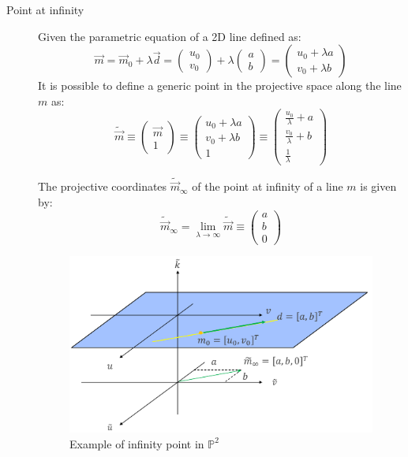 \begin{description}
    \item[Point at infinity] 
        Given the parametric equation of a 2D line defined as:
        \[ 
            \vec{m} = \vec{m}_0 + \lambda \vec{d} = 
            \begin{pmatrix} u_0 \\ v_0 \end{pmatrix} + \lambda \begin{pmatrix} a \\ b \end{pmatrix} =
            \begin{pmatrix} u_0 + \lambda a \\ v_0 + \lambda b \end{pmatrix}
        \]
        It is possible to define a generic point in the projective space along the line $m$ as:
        \[ 
            \tilde{\vec{m}} \equiv 
            \begin{pmatrix} \vec{m} \\ 1 \end{pmatrix} \equiv
            \begin{pmatrix} u_0 + \lambda a \\ v_0 + \lambda b \\ 1 \end{pmatrix} \equiv
            \begin{pmatrix} \frac{u_0}{\lambda} + a \\ \frac{v_0}{\lambda} + b \\ \frac{1}{\lambda} \end{pmatrix}
        \]

        The projective coordinates $\tilde{\vec{m}}_\infty$ of the point at infinity of a line $m$ is given by:
        \[ \tilde{\vec{m}}_\infty = \lim_{\lambda \rightarrow \infty} \tilde{\vec{m}} \equiv \begin{pmatrix} a \\ b \\ 0 \end{pmatrix} \]

        \begin{figure}[H]
            \centering
            \includegraphics[width=0.6\linewidth]{./img/_projective_point_inifinity.pdf}
            \caption{Example of infinity point in $\mathbb{P}^2$}
        \end{figure}


\end{description}
